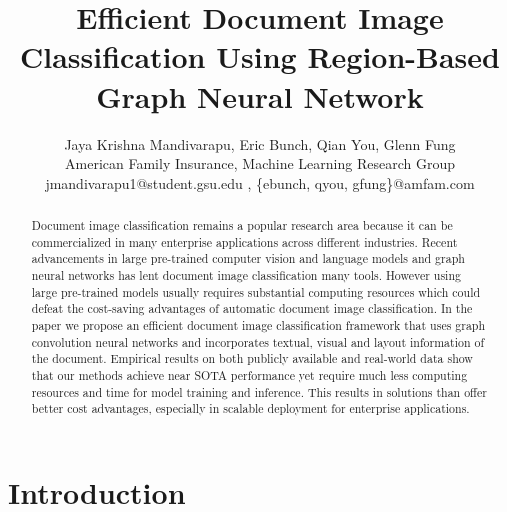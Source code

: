 \documentclass[letterpaper]{article}
\title {Efficient Document Image Classification Using Region-Based Graph Neural Network}
\author {Jaya Krishna Mandivarapu, Eric Bunch, Qian You, Glenn Fung \\
American Family Insurance, Machine Learning Research Group \\
jmandivarapu1@student.gsu.edu , \{ebunch, qyou, gfung\}@amfam.com \\
}
\begin{document}
\maketitle
\begin{abstract}
Document image classification remains a popular research area because it can be commercialized in many enterprise applications across different industries. Recent advancements in large pre-trained computer vision and language models and graph neural networks has lent document image classification many tools. However using large pre-trained models usually requires substantial computing resources which could defeat the  cost-saving advantages of  automatic document image classification. In the paper we propose an efficient document image classification framework that uses graph convolution neural networks and incorporates textual, visual and layout information of the document.
Empirical results on both publicly available and real-world data show that our methods achieve near SOTA performance yet require much less computing resources and time for model training and inference. This results in solutions than offer better cost advantages, especially in scalable deployment for enterprise applications.  
\end{abstract} \section{Introduction}
\end{document}
